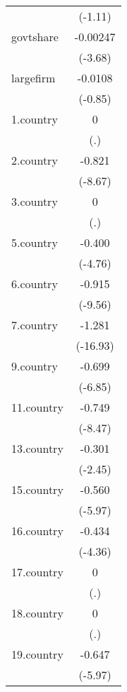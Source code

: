 {\begin{tabular}{l*{1}{c}}
            &     (-1.11)         \\
[1em]
govtshare   &    -0.00247\sym{***}\\
            &     (-3.68)         \\
[1em]
largefirm   &     -0.0108         \\
            &     (-0.85)         \\
[1em]
1.country   &           0         \\
            &         (.)         \\
[1em]
2.country   &      -0.821\sym{***}\\
            &     (-8.67)         \\
[1em]
3.country   &           0         \\
            &         (.)         \\
[1em]
5.country   &      -0.400\sym{***}\\
            &     (-4.76)         \\
[1em]
6.country   &      -0.915\sym{***}\\
            &     (-9.56)         \\
[1em]
7.country   &      -1.281\sym{***}\\
            &    (-16.93)         \\
[1em]
9.country   &      -0.699\sym{***}\\
            &     (-6.85)         \\
[1em]
11.country  &      -0.749\sym{***}\\
            &     (-8.47)         \\
[1em]
13.country  &      -0.301\sym{*}  \\
            &     (-2.45)         \\
[1em]
15.country  &      -0.560\sym{***}\\
            &     (-5.97)         \\
[1em]
16.country  &      -0.434\sym{***}\\
            &     (-4.36)         \\
[1em]
17.country  &           0         \\
            &         (.)         \\
[1em]
18.country  &           0         \\
            &         (.)         \\
[1em]
19.country  &      -0.647\sym{***}\\
            &     (-5.97)         \\

\end{tabular}}
